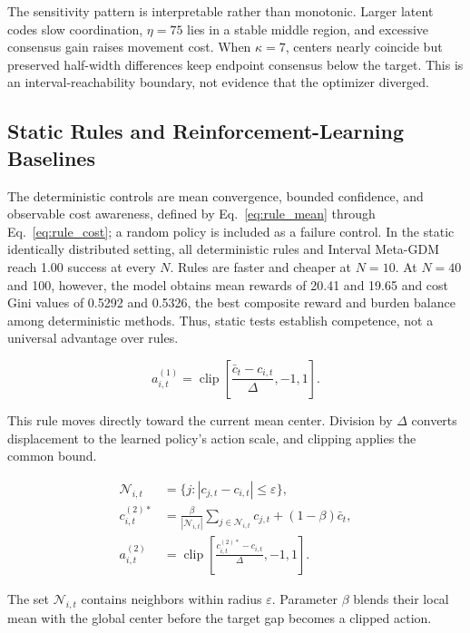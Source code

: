 \documentclass[journal]{IEEEtran}
\newcommand{\clip}{\operatorname{clip}}
\newcommand{\eqnote}[1]{\par\vspace{-0.3ex}\noindent #1\par\vspace{0.4ex}}
\begin{document}
The sensitivity pattern is interpretable rather than monotonic. Larger latent codes slow coordination, $\eta=75$ lies in a stable middle region, and excessive consensus gain raises movement cost. When $\kappa=7$, centers nearly coincide but preserved half-width differences keep endpoint consensus below the target. This is an interval-reachability boundary, not evidence that the optimizer diverged.

\subsection{Static Rules and Reinforcement-Learning Baselines}

The deterministic controls are mean convergence, bounded confidence, and observable cost awareness, defined by Eq.~\eqref{eq:rule_mean} through Eq.~\eqref{eq:rule_cost}; a random policy is included as a failure control. In the static identically distributed setting, all deterministic rules and Interval Meta-GDM reach 1.00 success at every $N$. Rules are faster and cheaper at $N=10$. At $N=40$ and 100, however, the model obtains mean rewards of 20.41 and 19.65 and cost Gini values of 0.5292 and 0.5326, the best composite reward and burden balance among deterministic methods. Thus, static tests establish competence, not a universal advantage over rules.

\begin{equation}
a_{i,t}^{(1)}=\clip\!\left[\frac{\bar c_t-c_{i,t}}{\Delta},-1,1\right].
\label{eq:rule_mean}
\end{equation}

\eqnote{This rule moves directly toward the current mean center. Division by $\Delta$ converts displacement to the learned policy's action scale, and clipping applies the common bound.}

\begin{equation}
\begin{aligned}
\mathcal N_{i,t}&=\{j:|c_{j,t}-c_{i,t}|\le\varepsilon\},\\
c_{i,t}^{(2)*}&=\frac{\beta}{|\mathcal N_{i,t}|}
\sum_{j\in\mathcal N_{i,t}}c_{j,t}+(1-\beta)\bar c_t,\\
a_{i,t}^{(2)}&=\clip\!\left[\frac{c_{i,t}^{(2)*}-c_{i,t}}{\Delta},-1,1\right].
\end{aligned}
\label{eq:rule_bounded}
\end{equation}

\eqnote{The set $\mathcal N_{i,t}$ contains neighbors within radius $\varepsilon$. Parameter $\beta$ blends their local mean with the global center before the target gap becomes a clipped action.}
\end{document}
